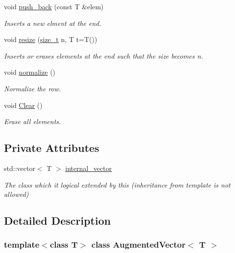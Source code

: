 \begin{DoxyCompactItemize}
void \hyperlink{classAugmentedVector_a0c04e9a119c8eac9da49f7e5b010da94}{push\+\_\+back} (const T \&elem)
\begin{DoxyCompactList}\small\item\em Inserts a new elment at the end. \end{DoxyCompactList}\item 
void \hyperlink{classAugmentedVector_ac7bda0c6b6794fd34869116dc5e5538b}{resize} (\hyperlink{tutorial__fpt__2017_2intro_2sixth_2test_8c_a7c94ea6f8948649f8d181ae55911eeaf}{size\+\_\+t} n, T t=T())
\begin{DoxyCompactList}\small\item\em Inserts or erases elements at the end such that the size becomes n. \end{DoxyCompactList}\item 
void \hyperlink{classAugmentedVector_a55477c79ed6d790255a44634c18d9e61}{normalize} ()
\begin{DoxyCompactList}\small\item\em Normalize the row. \end{DoxyCompactList}\item 
void \hyperlink{classAugmentedVector_ace877663b5bd547612aaaf2a9f58b94e}{Clear} ()
\begin{DoxyCompactList}\small\item\em Erase all elements. \end{DoxyCompactList}\end{DoxyCompactItemize}
\subsection*{Private Attributes}
\begin{DoxyCompactItemize}
\item 
std\+::vector$<$ T $>$ \hyperlink{classAugmentedVector_a07678225043fa36bd6718d655c4474d2}{internal\+\_\+vector}
\begin{DoxyCompactList}\small\item\em The class which it logical extended by this (inheritance from template is not allowed) \end{DoxyCompactList}\end{DoxyCompactItemize}


\subsection{Detailed Description}
\subsubsection*{template$<$class T$>$\newline
class Augmented\+Vector$<$ T $>$}



